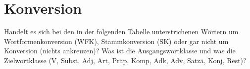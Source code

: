 \Halbzeile


\Halbzeile

\section{Konversion}


Handelt es sich bei den in der folgenden Tabelle unterstrichenen Wörtern um Wortformenkonversion (WFK), Stammkonversion (SK) oder gar nicht um Konversion (nichts ankreuzen)?
Was ist die Ausgangswortklasse und was die Zielwortklasse (V, Subst, Adj, Art, Präp, Komp, Adk, Adv, Satzä, Konj, Rest)?

